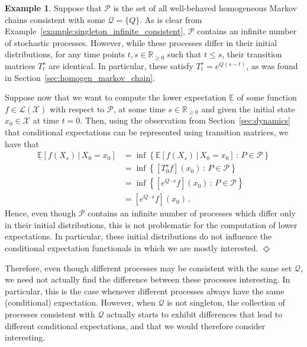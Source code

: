 \documentclass[10pt]{paper}
\theoremstyle{definition}
\newtheorem{exmp}{Example}%
\newcommand{\reals}{\mathbb{R}}
\newcommand{\realsnonneg}{\reals_{\geq 0}}
\newcommand{\states}{\mathcal{X}}
\newcommand{\gambles}{\mathcal{L}}
\newcommand{\gamblesX}{\gambles(\states)}
\newcommand{\rateset}{\mathcal{Q}}
\newcommand{\exampleend}{\hfill$\Diamond$}
\begin{document}
\begin{exmp}
Suppose that $\mathcal{P}$ is the set of all well-behaved homogeneous Markov chains consistent with some $\rateset=\{Q\}$. As is clear from Example~\ref{example:singleton_infinite_consistent}, $\mathcal{P}$ contains an infinite number of stochastic processes. However, while these processes differ in their initial distributions, for any time points $t,s\in\realsnonneg$ such that $t\leq s$, their transition matrices $T_t^s$ are identical. In particular, these satisfy $T_t^s=e^{Q(s-t)}$, as was found in Section~\ref{sec:homogen_markov_chain}.

Suppose now that we want to compute the lower expectation $\underline{\mathbb{E}}$ of some function $f\in\gamblesX$ with respect to $\mathcal{P}$, at some time $s\in\realsnonneg$ and given the initial state $x_0\in\states$ at time $t=0$. Then, using the observation from Section~\ref{sec:dynamics} that conditional expectations can be represented using transition matrices, we have that
\begin{align*}
\underline{\mathbb{E}}[f(X_s)\,\vert\,X_{0}=x_0] &= \inf\left\{\mathbb{E}[f(X_s)\,\vert\,X_{0}=x_0]\,:\,P\in\mathcal{P}\right\} \\
 &= \inf\left\{ [T_0^sf](x_0) \,:\,P\in\mathcal{P}\right\} \\
 &= \inf\left\{ [e^{Q\cdot s}f](x_0)\,:\,P\in\mathcal{P}\right\} \\
 &= [e^{Q\cdot s}f](x_0)\,.
\end{align*}
Hence, even though $\mathcal{P}$ contains an infinite number of processes which differ only in their initial distributions, this is not problematic for the computation of lower expectations. In particular, these initial distributions do not influence the conditional expectation functionals in which we are mostly interested.
\exampleend
\end{exmp}



Therefore, even though different processes may be consistent with the same set $\rateset$, we need not actually find the difference between these processes interesting. In particular, this is the case whenever different processes always have the same (conditional) expectation. However, when $\rateset$ is not singleton, the collection of processes consistent with $\rateset$ actually starts to exhibit differences that lead to different conditional expectations, and that we would therefore consider interesting.
\end{document}
